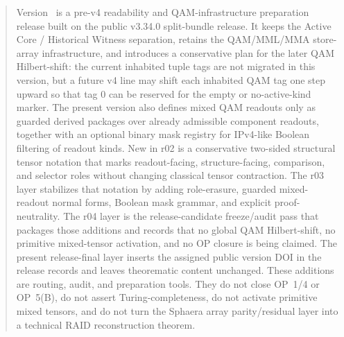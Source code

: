 \begin{abstract}
Version~\docversion{} is a pre-v4 readability and QAM-infrastructure preparation release built on the public v3.34.0 split-bundle release. It keeps the Active Core / Historical Witness separation, retains the QAM/MML/MMA store-array infrastructure, and introduces a conservative plan for the later QAM Hilbert-shift: the current inhabited tuple tags are not migrated in this version, but a future v4 line may shift each inhabited QAM tag one step upward so that tag 0 can be reserved for the empty or no-active-kind marker. The present version also defines mixed QAM readouts only as guarded derived packages over already admissible component readouts, together with an optional binary mask registry for IPv4-like Boolean filtering of readout kinds. New in r02 is a conservative two-sided structural tensor notation that marks readout-facing, structure-facing, comparison, and selector roles without changing classical tensor contraction. The r03 layer stabilizes that notation by adding role-erasure, guarded mixed-readout normal forms, Boolean mask grammar, and explicit proof-neutrality. The r04 layer is the release-candidate freeze/audit pass that packages those additions and records that no global QAM Hilbert-shift, no primitive mixed-tensor activation, and no OP closure is being claimed. The present release-final layer inserts the assigned public version DOI in the release records and leaves theorematic content unchanged. These additions are routing, audit, and preparation tools. They do not close OP~1/4 or OP~5(B), do not assert Turing-completeness, do not activate primitive mixed tensors, and do not turn the Sphaera array parity/residual layer into a technical RAID reconstruction theorem.
\end{abstract}

\clearpage
